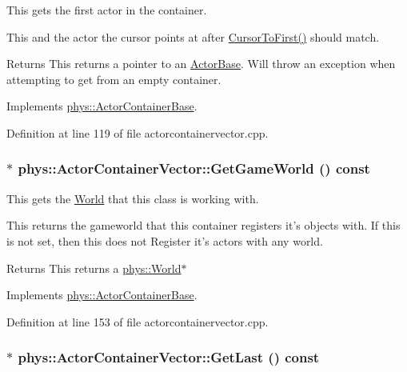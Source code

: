 This gets the first actor in the container. 

This and the actor the cursor points at after \hyperlink{classphys_1_1ActorContainerVector_ad9c2eb2a9405dcf687c86745afc9c031}{CursorToFirst()} should match. \begin{DoxyReturn}{Returns}
This returns a pointer to an \hyperlink{classphys_1_1ActorBase}{ActorBase}. Will throw an exception when attempting to get from an empty container. 
\end{DoxyReturn}


Implements \hyperlink{classphys_1_1ActorContainerBase_ae703482d84a9c6726e28a8f26418b161}{phys::ActorContainerBase}.



Definition at line 119 of file actorcontainervector.cpp.

\hypertarget{classphys_1_1ActorContainerVector_a5519eb0000073a2f397e158bfc368349}{
\subsubsection[{GetGameWorld}]{ $\ast$ phys::ActorContainerVector::GetGameWorld () const}}
\label{d3/d64/classphys_1_1ActorContainerVector_a5519eb0000073a2f397e158bfc368349}


This gets the \hyperlink{classphys_1_1World}{World} that this class is working with. 

This returns the gameworld that this container registers it's objects with. If this is not set, then this does not Register it's actors with any world. \begin{DoxyReturn}{Returns}
This returns a \hyperlink{classphys_1_1World}{phys::World}$\ast$ 
\end{DoxyReturn}


Implements \hyperlink{classphys_1_1ActorContainerBase_a479e6c7434f2611b0cfe6ca1fd4ebdd1}{phys::ActorContainerBase}.



Definition at line 153 of file actorcontainervector.cpp.

\hypertarget{classphys_1_1ActorContainerVector_a211f6e419ef0b753cecf2c662a54511e}{
\subsubsection[{GetLast}]{ $\ast$ phys::ActorContainerVector::GetLast () const}}
\label{d3/d64/classphys_1_1ActorContainerVector_a211f6e419ef0b753cecf2c662a54511e}


